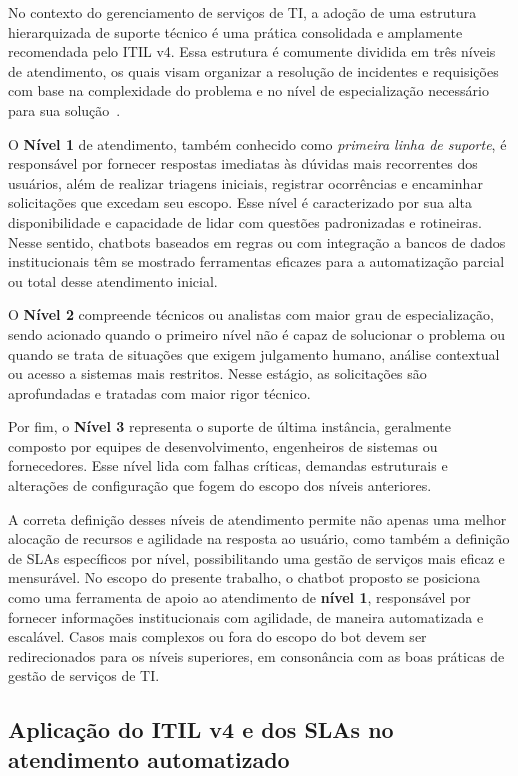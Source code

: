 No contexto do gerenciamento de serviços de TI, a adoção de uma estrutura hierarquizada de suporte técnico é uma prática consolidada e amplamente recomendada pelo ITIL v4. Essa estrutura é comumente dividida em três níveis de atendimento, os quais visam organizar a resolução de incidentes e requisições com base na complexidade do problema e no nível de especialização necessário para sua solução~\cite{axelos2019itil}.

O \textbf{Nível 1} de atendimento, também conhecido como \emph{primeira linha de suporte}, é responsável por fornecer respostas imediatas às dúvidas mais recorrentes dos usuários, além de realizar triagens iniciais, registrar ocorrências e encaminhar solicitações que excedam seu escopo. Esse nível é caracterizado por sua alta disponibilidade e capacidade de lidar com questões padronizadas e rotineiras. Nesse sentido, chatbots baseados em regras ou com integração a bancos de dados institucionais têm se mostrado ferramentas eficazes para a automatização parcial ou total desse atendimento inicial.

O \textbf{Nível 2} compreende técnicos ou analistas com maior grau de especialização, sendo acionado quando o primeiro nível não é capaz de solucionar o problema ou quando se trata de situações que exigem julgamento humano, análise contextual ou acesso a sistemas mais restritos. Nesse estágio, as solicitações são aprofundadas e tratadas com maior rigor técnico.

Por fim, o \textbf{Nível 3} representa o suporte de última instância, geralmente composto por equipes de desenvolvimento, engenheiros de sistemas ou fornecedores. Esse nível lida com falhas críticas, demandas estruturais e alterações de configuração que fogem do escopo dos níveis anteriores.

A correta definição desses níveis de atendimento permite não apenas uma melhor alocação de recursos e agilidade na resposta ao usuário, como também a definição de SLAs específicos por nível, possibilitando uma gestão de serviços mais eficaz e mensurável. No escopo do presente trabalho, o chatbot proposto se posiciona como uma ferramenta de apoio ao atendimento de \textbf{nível 1}, responsável por fornecer informações institucionais com agilidade, de maneira automatizada e escalável. Casos mais complexos ou fora do escopo do bot devem ser redirecionados para os níveis superiores, em consonância com as boas práticas de gestão de serviços de TI.

\subsection{Aplicação do ITIL v4 e dos SLAs no atendimento automatizado}

